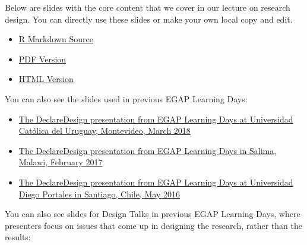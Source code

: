 \documentclass[12pt,]{book}
\begin{document}
Below are slides with the core content that we cover in our lecture on research design. You can directly use these slides or make your own local copy and edit.

\begin{itemize}
\item
  \href{https://egap.github.io/learningdays-resources/Slides/researchdesignform-slides.Rmd}{R Markdown Source}
\item
  \href{https://egap.github.io/learningdays-resources/Slides/researchdesignform-slides.pdf}{PDF Version}
\item
  \href{https://egap.github.io/learningdays-resources/Slides/researchdesignform-slides.html}{HTML Version}
\end{itemize}

You can also see the slides used in previous EGAP Learning Days:

\begin{itemize}
\item
  \href{https://egap.github.io/learningdays-resources/Slides/Examples/declare_design-montevideo.pdf}{The DeclareDesign presentation from EGAP Learning Days at Universidad Católica del Uruguay, Montevideo, March 2018}
\item
  \href{https://egap.github.io/learningdays-resources/Slides/Examples/declare_design-malawi.pdf}{The DeclareDesign presentation from EGAP Learning Days in Salima, Malawi, February 2017}
\item
  \href{https://egap.github.io/learningdays-resources/Slides/Examples/declare_design-santiago.pdf}{The DeclareDesign presentation from EGAP Learning Days at Universidad Diego Portales in Santiago, Chile, May 2016}
\end{itemize}

You can also see slides for Design Talks in previous EGAP Learning Days, where presenters focus on issues that come up in designing the research, rather than the results:
\end{document}
